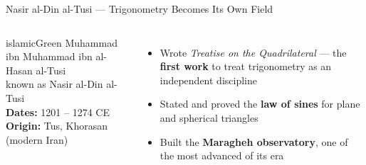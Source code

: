 \begin{frame}[shrink=4]{Nasir al-Din al-Tusi --- Trigonometry Becomes Its Own Field}
  \begin{columns}[T]
    \begin{personbox}{islamicGreen}
      {\small Muhammad ibn Muhammad ibn al-Hasan al-Tusi\\
      known as Nasir al-Din al-Tusi}\\[3pt]
      \textbf{Dates:} 1201 -- 1274 CE\\
      \textbf{Origin:} Tus, Khorasan (modern Iran)
    \end{personbox}
    \vspace{0.3em}
    \begin{itemize}
      \item Wrote \textit{Treatise on the Quadrilateral} --- the \textbf{first work} to treat trigonometry as an independent discipline
      \item Stated and proved the \textbf{law of sines} for plane and spherical triangles
      \item Built the \textbf{Maragheh observatory}, one of the most advanced of its era
    \end{itemize}


    \vspace{0.3em}
  \end{columns}

\end{frame}


